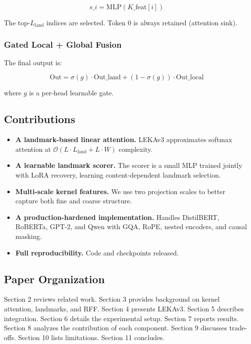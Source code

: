 \[
s\_i = \text{MLP}(K\_\text{feat}[i])
\tag{1.5}
\]

The top-$L_\text{land}$ indices are selected. Token 0 is always retained 
(attention sink).

\subsubsection{Gated Local + Global Fusion}

The final output is:

\[
\text{Out} = \sigma(g) \cdot \text{Out}\_\text{land} + (1 - \sigma(g)) \cdot \text{Out}\_\text{local}
\tag{1.6}
\]

where $g$ is a per-head learnable gate.

\subsection{Contributions}

\begin{itemize}
\item \textbf{A landmark-based linear attention.} LEKAv3 approximates softmax attention
  at $\mathcal{O}(L \cdot L_\text{land} + L \cdot W)$ complexity.
\item \textbf{A learnable landmark scorer.} The scorer is a small MLP trained jointly
  with LoRA recovery, learning content-dependent landmark selection.
\item \textbf{Multi-scale kernel features.} We use two projection scales to better
  capture both fine and coarse structure.
\item \textbf{A production-hardened implementation.} Handles DistilBERT, RoBERTa,
  GPT-2, and Qwen with GQA, RoPE, nested encoders, and causal masking.
\item \textbf{Full reproducibility.} Code and checkpoints released.

\end{itemize}
\subsection{Paper Organization}

Section 2 reviews related work. Section 3 provides background on kernel 
attention, landmarks, and RFF. Section 4 presents LEKAv3. Section 5 
describes integration. Section 6 details the experimental setup. Section 7 
reports results. Section 8 analyzes the contribution of each component. 
Section 9 discusses trade-offs. Section 10 lists limitations. Section 11 
concludes.



